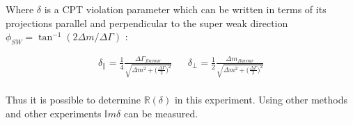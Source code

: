 \noindent Where $\delta$ is a CPT violation parameter which can be written in terms of its projections parallel and perpendicular to the super weak direction $\phi_{SW} = \tan^{-1} (2 \Delta m / \Delta \Gamma)$ \cite{PDGKaons}:

\begin{align*}
\delta_{\parallel} = \frac{1}{4} \frac{{\Delta \Gamma}_{flavour}}{\sqrt{\Delta m^{2} + \big(\frac{\Delta \Gamma}{2} \big)^{2}}} & & \delta_{\perp} = \frac{1}{2} \frac{{\Delta m}_{flavour}}{\sqrt{\Delta m^{2} + \big(\frac{\Delta \Gamma}{2} \big)^{2}}} \\
\end{align*}

Thus it is possible to determine $\mathbb{R}({\delta})$ in this experiment. Using other methods and other experiments $\mathbb{I}m{\delta}$ can be measured. 
  
  
  
  